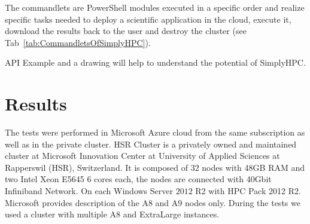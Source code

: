 \documentclass[3p,times]{elsarticle}
\begin{document}
The commandlets are PowerShell modules executed in a specific order and realize specific tasks needed to deploy a scientific application in the cloud, execute it, download the results back to the user and destroy the cluster (see Tab~\ref{tab:CommandletsOfSimplyHPC}).  

\textcolor[rgb]{1,0,0}{API Example and a drawing will help to understand the potential of SimplyHPC.}

\section{Results}
\label{sec:results}
	
The tests were performed in Microsoft Azure cloud from the same subscription as well as in the private cluster. HSR Cluster is a privately owned and maintained cluster at Microsoft Innovation Center at University of Applied Sciences at Rapperswil (HSR), Switzerland. It is composed of $32$ nodes with 48GB RAM and two Intel Xeon E5645 6 cores each, the nodes are connected with 40Gbit Infiniband Network. On each Windows Server $2012$ R2 with HPC Pack 2012 R2. Microsoft provides description of the A8 and A9 nodes only. During the tests we used a cluster with multiple A8 and ExtraLarge instances.
\end{document}
